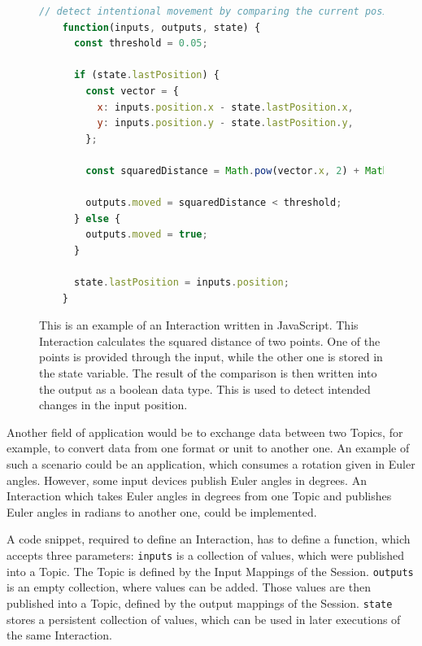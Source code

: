 \begin{figure}[H]
	\begin{lstlisting}[language=JavaScript]
    // detect intentional movement by comparing the current position with a previous one
    function(inputs, outputs, state) {
      const threshold = 0.05;

      if (state.lastPosition) {
        const vector = {
          x: inputs.position.x - state.lastPosition.x,
          y: inputs.position.y - state.lastPosition.y,
        };

        const squaredDistance = Math.pow(vector.x, 2) + Math.pow(vector.y, 2);

        outputs.moved = squaredDistance < threshold;
      } else {
        outputs.moved = true;
      }

      state.lastPosition = inputs.position;
    }
  \end{lstlisting}
	\caption[UBII Interaction in JavaScript]{This is an example of an Interaction written in JavaScript. This Interaction calculates the squared distance of two points. One of the points is provided through the input, while the other one is stored in the state variable. The result of the comparison is then written into the output as a boolean data type. This is used to detect intended changes in the input position.}\label{fig:ubii-interaction-example}
\end{figure}

Another field of application would be to exchange data between two Topics, for example, to convert data from one format or unit to another one. An example of such a scenario could be an application, which consumes a rotation given in Euler angles. %
However, some input devices publish Euler angles in degrees. An Interaction which takes Euler angles in degrees from one Topic and publishes Euler angles in radians to another one, could be implemented.

A code snippet, required to define an Interaction, has to define a function, which accepts three parameters:
\lstinline{inputs} is a collection of values, which were published into a Topic. The Topic is defined by the Input Mappings of the Session. \lstinline{outputs} is an empty collection, where values can be added. Those values are then published into a Topic, defined by the output mappings of the Session. \lstinline{state} stores a persistent collection of values, which can be used in later executions of the same Interaction.